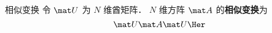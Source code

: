 

\begin{definition}{相似变换}
令 $\mat U$ 为 $N$ 维酋矩阵． $N$ 维方阵 $\mat A$ 的\textbf{相似变换}为
\begin{equation}
\mat U \mat A \mat U\Her
\end{equation}
\end{definition}
